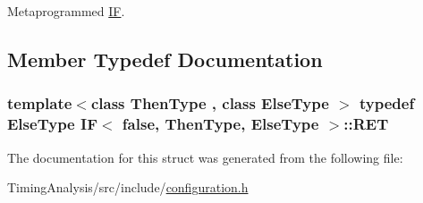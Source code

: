Metaprogrammed \hyperlink{structIF}{I\-F}. 

\subsection{Member Typedef Documentation}
\hypertarget{structIF_3_01false_00_01ThenType_00_01ElseType_01_4_aa7d9ee5d71d3235a17de49470e2a00a0}{
\subsubsection[{R\-E\-T}]{\setlength{\rightskip}{0pt plus 5cm}template$<$class Then\-Type , class Else\-Type $>$ typedef Else\-Type {\bf I\-F}$<$ false, Then\-Type, Else\-Type $>$\-::{\bf R\-E\-T}}}\label{structIF_3_01false_00_01ThenType_00_01ElseType_01_4_aa7d9ee5d71d3235a17de49470e2a00a0}


The documentation for this struct was generated from the following file\-:\begin{DoxyCompactItemize}
\item 
Timing\-Analysis/src/include/\hyperlink{configuration_8h}{configuration.\-h}\end{DoxyCompactItemize}
